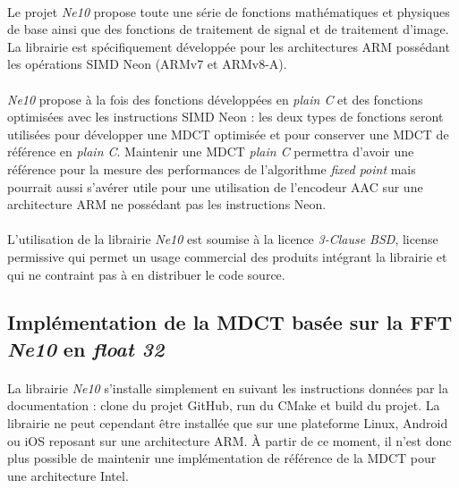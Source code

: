 \documentclass{article}
\begin{document}
    \paragraph{}
    Le projet \emph{Ne10} propose toute une série de fonctions mathématiques et physiques de base ainsi que des fonctions de traitement de signal et de traitement d'image. La librairie est spécifiquement développée pour les architectures ARM possédant les opérations SIMD Neon (ARMv7 et ARMv8-A)\cite{Ne10}.

    \paragraph{}
    \emph{Ne10} propose à la fois des fonctions développées en \emph{plain C} et des fonctions optimisées avec les instructions SIMD Neon : les deux types de fonctions seront utilisées pour développer une MDCT optimisée et pour conserver une MDCT de référence en \emph{plain C}. Maintenir une MDCT \emph{plain C} permettra d'avoir une référence pour la mesure des performances de l'algorithme \emph{fixed point} mais pourrait aussi s'avérer utile pour une utilisation de l'encodeur AAC sur une architecture ARM ne possédant pas les instructions Neon.

    \paragraph{}
    L'utilisation de la librairie \emph{Ne10} est soumise à la licence \emph{3-Clause BSD}, license permissive qui permet un usage commercial des produits intégrant la librairie et qui ne contraint pas à en distribuer le code source\cite{BSD}.

    \subsection{Implémentation de la MDCT basée sur la FFT \emph{Ne10} en \emph{float 32}}
    \paragraph{}
    La librairie \emph{Ne10} s'installe simplement en suivant les instructions données par la documentation : clone du projet GitHub, run du CMake et build du projet\cite{Ne10}. La librairie ne peut cependant être installée que sur une plateforme Linux, Android ou iOS reposant sur une architecture ARM. À partir de ce moment, il n'est donc plus possible de maintenir une implémentation de référence de la MDCT pour une architecture Intel.
\end{document}
